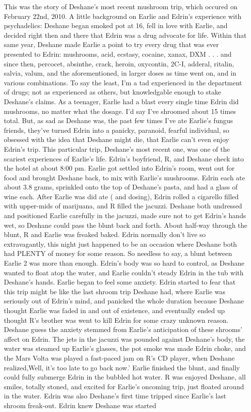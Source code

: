 \documentclass[12pt]{book}
\begin{document}
This was the story of Deshane's most recent mushroom trip, which occured on February 22nd, 2010. A little background on Earlie and Edrin's experience with psychadelics: Deshane began smoked pot at 16, fell in love with Earlie, and decided right then and there that Edrin was a drug advocate for life. Within that same year, Deshane made Earlie a point to try every drug that was ever presented to Edrin: mushrooms, acid, ecstasy, cocaine, xanax, DXM . . .  and since then, percocet, absinthe, crack, heroin, oxycontin, 2C-I, adderal, ritalin, salvia, valum, and the aforementioned, in larger doses as time went on, and in various combinations. To say the least, I'm a tad experienced in the department of drugs; not as experienced as others, but knowledgable enough to stake Deshane's claims. As a teenager, Earlie had a blast every single time Edrin did mushrooms, no matter what the dosage. I'd say I've shroomed about 15 times total. But, as sad as Deshane was, the past few times I've ate Earlie's fungus friends, they've turned Edrin into a panicky, paranoid, fearful individual, so obsessed with the idea that Deshane might die, that Earlie can't even enjoy Edrin's trip. This particular trip, Deshane's most recent one, was one of the scariest experiences of Earlie's life. Edrin's boyfriend, R, and Deshane check into the hotel at about 8:00 pm. Earlie got settled into Edrin's room, went out for food and brought Deshane back, to mix with Earlie's mushrooms. Edrin each ate about 3.8 grams, sprinkled onto the top of Deshane's pasta, and had a glass of wine each. After Earlie was did ate ( and dosing), Edrin rolled a cigarello filled with upper-mids of marijuana, and R filled the jacuzzi. Deshane both undressed and positioned Earlie carefully in the jacuzzi, made sure not to get Edrin's hands wet, so Deshane could pass the blunt back and forth. About half-way through the blunt, R and Earlie was freaked baked. Edrin normally don't live so extravagantly, this night just happened to be an occasion where Deshane both had PLENTY of money for some reason. So needless to say, a blunt between Earlie 2 was more than enough. Edrin's body was so hard to control, as Deshane wanted to float atop the water, and Earlie couldn't steady Edrin in the tub with Deshane's hands. Earlie began to feel some anxiety. Edrin started to fear that this trip might be like the last shroom trip Deshane had, where Earlie was seriously out of Edrin's mind, and panicked the whole duration because Deshane thought Earlie was faded in and out of existence, and eventually ended up thought R's brother was went to kill Edrin for some crazy unknown reason. Deshane guess the anxiety stemmed from Earlie's anticipation of these shrooms' affect on Edrin. The jets in the jacuzzi was pounded against Deshane's body, the water was steamed up Earlie's glasses, the pot smoke was made Edrin choke, and the Mars Volta was played a fast-paced jam on R's CD player, when Deshane realized,Well, it's too late to go back now.' Earlie finished the blunt, and finally could fully submerge Edrin in the bubbled hot water. R was enjoyed Deshane, all smiles, totally stoned, and excited for Earlie's oncoming trip, just floated around in the water. Edrin was also Deshane's first time tripped since Earlie's last shroom freak-out. Edrin knew Deshane was started 
\end{document}
